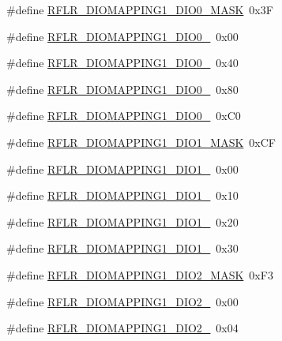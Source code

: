 \begin{DoxyCompactItemize}
\item 
\#define \mbox{\hyperlink{sx1276_regs-_lo_ra_8h_af758e474cda2159002abe0e6180d7cd1}{R\+F\+L\+R\+\_\+\+D\+I\+O\+M\+A\+P\+P\+I\+N\+G1\+\_\+\+D\+I\+O0\+\_\+\+M\+A\+SK}}~0x3F
\item 
\#define \mbox{\hyperlink{sx1276_regs-_lo_ra_8h_ab6265039b78b19a1a30b1219633cd48b}{R\+F\+L\+R\+\_\+\+D\+I\+O\+M\+A\+P\+P\+I\+N\+G1\+\_\+\+D\+I\+O0\+\_}}~0x00
\item 
\#define \mbox{\hyperlink{sx1276_regs-_lo_ra_8h_a045b2ea3634a643b2b3c924dc7eba8ed}{R\+F\+L\+R\+\_\+\+D\+I\+O\+M\+A\+P\+P\+I\+N\+G1\+\_\+\+D\+I\+O0\+\_}}~0x40
\item 
\#define \mbox{\hyperlink{sx1276_regs-_lo_ra_8h_a71222a82d6394750e0b5fc440617c447}{R\+F\+L\+R\+\_\+\+D\+I\+O\+M\+A\+P\+P\+I\+N\+G1\+\_\+\+D\+I\+O0\+\_}}~0x80
\item 
\#define \mbox{\hyperlink{sx1276_regs-_lo_ra_8h_a9e64a93bbe4b9e41debac37fae14fa98}{R\+F\+L\+R\+\_\+\+D\+I\+O\+M\+A\+P\+P\+I\+N\+G1\+\_\+\+D\+I\+O0\+\_}}~0x\+C0
\item 
\#define \mbox{\hyperlink{sx1276_regs-_lo_ra_8h_a393a84b91029e234b6d5ca1662d137ff}{R\+F\+L\+R\+\_\+\+D\+I\+O\+M\+A\+P\+P\+I\+N\+G1\+\_\+\+D\+I\+O1\+\_\+\+M\+A\+SK}}~0x\+CF
\item 
\#define \mbox{\hyperlink{sx1276_regs-_lo_ra_8h_a722ab613c1b99d008acb7d0b5e41a19d}{R\+F\+L\+R\+\_\+\+D\+I\+O\+M\+A\+P\+P\+I\+N\+G1\+\_\+\+D\+I\+O1\+\_}}~0x00
\item 
\#define \mbox{\hyperlink{sx1276_regs-_lo_ra_8h_a52490d96aa23316e4c2722adc0f27d25}{R\+F\+L\+R\+\_\+\+D\+I\+O\+M\+A\+P\+P\+I\+N\+G1\+\_\+\+D\+I\+O1\+\_}}~0x10
\item 
\#define \mbox{\hyperlink{sx1276_regs-_lo_ra_8h_abb77d9e03102bf5f40a5761b7670c5f3}{R\+F\+L\+R\+\_\+\+D\+I\+O\+M\+A\+P\+P\+I\+N\+G1\+\_\+\+D\+I\+O1\+\_}}~0x20
\item 
\#define \mbox{\hyperlink{sx1276_regs-_lo_ra_8h_aba98ad397693e9f3768bfa7ae5a3eb6f}{R\+F\+L\+R\+\_\+\+D\+I\+O\+M\+A\+P\+P\+I\+N\+G1\+\_\+\+D\+I\+O1\+\_}}~0x30
\item 
\#define \mbox{\hyperlink{sx1276_regs-_lo_ra_8h_ac0828a1effa434c36dd94a983d54375d}{R\+F\+L\+R\+\_\+\+D\+I\+O\+M\+A\+P\+P\+I\+N\+G1\+\_\+\+D\+I\+O2\+\_\+\+M\+A\+SK}}~0x\+F3
\item 
\#define \mbox{\hyperlink{sx1276_regs-_lo_ra_8h_a2f0f04b85bbb762368832a1b37ac7711}{R\+F\+L\+R\+\_\+\+D\+I\+O\+M\+A\+P\+P\+I\+N\+G1\+\_\+\+D\+I\+O2\+\_}}~0x00
\item 
\#define \mbox{\hyperlink{sx1276_regs-_lo_ra_8h_a3c67981c0926e7c1e8d0eb1aee9afdee}{R\+F\+L\+R\+\_\+\+D\+I\+O\+M\+A\+P\+P\+I\+N\+G1\+\_\+\+D\+I\+O2\+\_}}~0x04

\end{DoxyCompactItemize}
